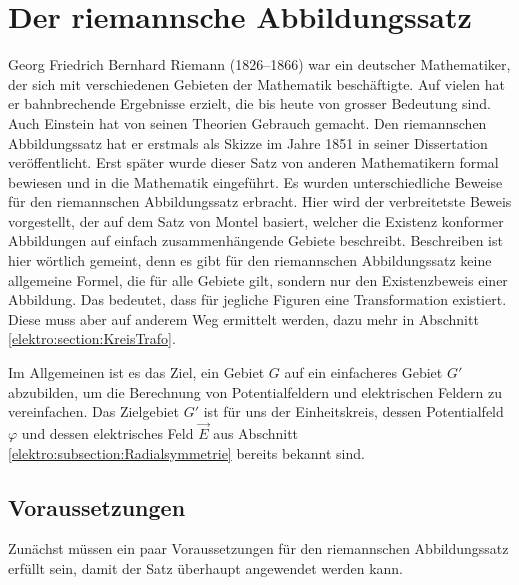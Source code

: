 %
%
%
%


\section{Der riemannsche Abbildungssatz
\label{elektro:section:RiemannSatz}}

Georg Friedrich Bernhard Riemann (1826--1866) \cite{elektro:riemann} war ein deutscher Mathematiker, der sich mit verschiedenen Gebieten der Mathematik beschäftigte.
%
Auf vielen hat er bahnbrechende Ergebnisse erzielt, die bis heute von grosser Bedeutung sind.
Auch Einstein hat von seinen Theorien Gebrauch gemacht.
Den riemannschen Abbildungssatz hat er erstmals als Skizze im Jahre 1851 in seiner Dissertation veröffentlicht.
Erst später wurde dieser Satz von anderen Mathematikern formal bewiesen und in die Mathematik eingeführt.
Es wurden unterschiedliche Beweise für den riemannschen Abbildungssatz erbracht.
%
%
Hier wird der verbreitetste Beweis vorgestellt, der auf dem Satz von Montel basiert, welcher die Existenz konformer Abbildungen auf einfach zusammenhängende Gebiete beschreibt.
%
Beschreiben ist hier wörtlich gemeint, denn es gibt für den riemannschen Abbildungssatz keine allgemeine Formel, die für alle Gebiete gilt, sondern nur den Existenzbeweis einer Abbildung.
Das bedeutet, dass für jegliche Figuren eine Transformation existiert.
Diese muss aber auf anderem Weg ermittelt werden, dazu mehr in Abschnitt \ref{elektro:section:KreisTrafo}.

Im Allgemeinen ist es das Ziel, ein Gebiet $G$ auf ein einfacheres Gebiet $G'$ abzubilden, um die Berechnung von Potentialfeldern und elektrischen Feldern zu vereinfachen.
Das Zielgebiet $G'$ ist für uns der Einheitskreis, dessen Potentialfeld $\varphi$ und dessen elektrisches Feld $\vec{E}$ aus Abschnitt \ref{elektro:subsection:Radialsymmetrie} bereits bekannt sind.

\subsection{Voraussetzungen
\label{elektro:subsection:RiemannVoraussetzungen}}
Zunächst müssen ein paar Voraussetzungen für den riemannschen Abbildungssatz erfüllt sein, damit der Satz überhaupt angewendet werden kann.

